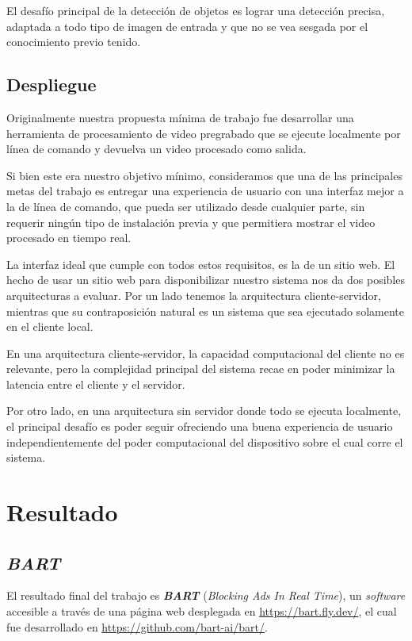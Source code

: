 \documentclass[a4paper]{article}
\begin{document}
El desafío principal de la detección de objetos es lograr una detección precisa, adaptada a todo tipo de imagen de entrada y que no se vea sesgada por el conocimiento previo tenido.

\subsection{Despliegue}

Originalmente nuestra propuesta mínima de trabajo fue desarrollar una herramienta de procesamiento de video pregrabado que se ejecute localmente por línea de comando y devuelva un video procesado como salida.

Si bien este era nuestro objetivo mínimo, consideramos que una de las principales metas del trabajo es entregar una experiencia de usuario con una interfaz mejor a la de línea de comando, que pueda ser utilizado desde cualquier parte, sin requerir ningún tipo de instalación previa y que permitiera mostrar el video procesado en tiempo real.

La interfaz ideal que cumple con todos estos requisitos, es la de un sitio web. El hecho de usar un sitio web para disponibilizar nuestro sistema nos da dos posibles arquitecturas a evaluar. Por un lado tenemos la arquitectura cliente-servidor, mientras que su contraposición natural es un sistema que sea ejecutado solamente en el cliente local.

En una arquitectura cliente-servidor, la capacidad computacional del cliente no es relevante, pero la complejidad principal del sistema recae en poder minimizar la latencia entre el cliente y el servidor.

Por otro lado, en una arquitectura sin servidor donde todo se ejecuta localmente, el principal desafío es poder seguir ofreciendo una buena experiencia de usuario independientemente del poder computacional del dispositivo sobre el cual corre el sistema.

\section{Resultado}

\subsection{\textit{BART}}

El resultado final del trabajo es \textit{\textbf{BART}} (\textit{Blocking Ads In Real Time}), un \textit{software} accesible a través de una página web desplegada en \url{https://bart.fly.dev/}, el cual fue desarrollado en \url{https://github.com/bart-ai/bart/}.
\end{document}
